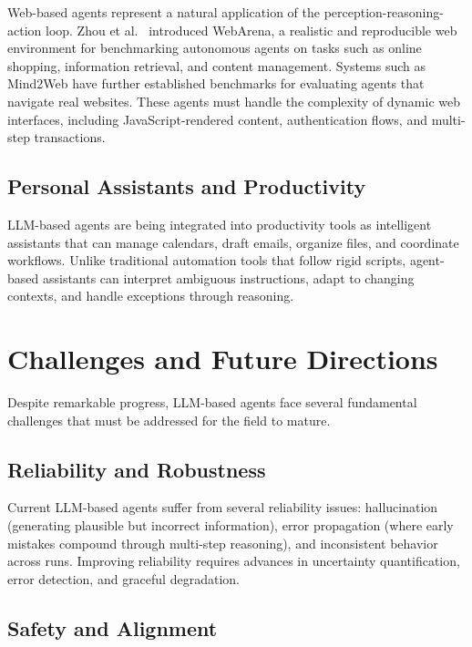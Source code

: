 \documentclass[11pt,a4paper]{article}
\begin{document}
Web-based agents represent a natural application of the perception-reasoning-action loop. Zhou et al.~\citep{zhou2023webarena} introduced WebArena, a realistic and reproducible web environment for benchmarking autonomous agents on tasks such as online shopping, information retrieval, and content management. Systems such as Mind2Web have further established benchmarks for evaluating agents that navigate real websites. These agents must handle the complexity of dynamic web interfaces, including JavaScript-rendered content, authentication flows, and multi-step transactions.

\subsection{Personal Assistants and Productivity}

LLM-based agents are being integrated into productivity tools as intelligent assistants that can manage calendars, draft emails, organize files, and coordinate workflows. Unlike traditional automation tools that follow rigid scripts, agent-based assistants can interpret ambiguous instructions, adapt to changing contexts, and handle exceptions through reasoning.

\section{Challenges and Future Directions}
\label{sec:challenges}

Despite remarkable progress, LLM-based agents face several fundamental challenges that must be addressed for the field to mature.

\subsection{Reliability and Robustness}

Current LLM-based agents suffer from several reliability issues: hallucination (generating plausible but incorrect information), error propagation (where early mistakes compound through multi-step reasoning), and inconsistent behavior across runs. Improving reliability requires advances in uncertainty quantification, error detection, and graceful degradation.

\subsection{Safety and Alignment}
\end{document}

